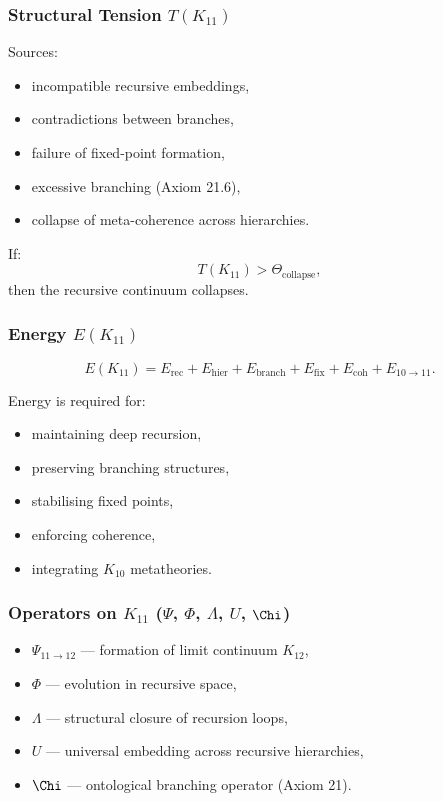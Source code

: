 \subsubsection{Structural Tension $T(K_{11})$}

Sources:
\begin{itemize}
    \item incompatible recursive embeddings,
    \item contradictions between branches,
    \item failure of fixed-point formation,
    \item excessive branching (Axiom 21.6),
    \item collapse of meta-coherence across hierarchies.
\end{itemize}

If:
\[
T(K_{11}) > \Theta_{\mathrm{collapse}},
\]
then the recursive continuum collapses.

\subsubsection{Energy $E(K_{11})$}

\[
E(K_{11})=
E_{\mathrm{rec}}+
E_{\mathrm{hier}}+
E_{\mathrm{branch}}+
E_{\mathrm{fix}}+
E_{\mathrm{coh}}+
E_{10\to11}.
\]

Energy is required for:
\begin{itemize}
    \item maintaining deep recursion,
    \item preserving branching structures,
    \item stabilising fixed points,
    \item enforcing coherence,
    \item integrating $K_{10}$ metatheories.
\end{itemize}

\subsubsection{Operators on $K_{11}$ ($\Psi$, $\Phi$, $\Lambda$, $U$, $\Chi$)}

\begin{itemize}
    \item $\Psi_{11\to12}$ — formation of limit continuum $K_{12}$,
    \item $\Phi$ — evolution in recursive space,
    \item $\Lambda$ — structural closure of recursion loops,
    \item $U$ — universal embedding across recursive hierarchies,
    \item $\Chi$ — ontological branching operator (Axiom 21).
\end{itemize}

